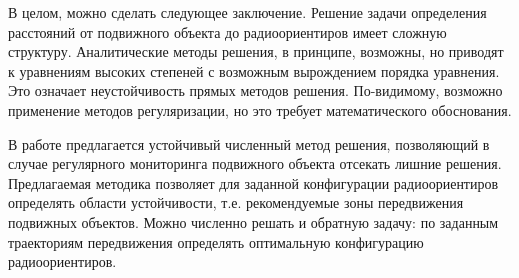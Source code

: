 \documentclass[../main.tex]{subfiles}
\begin{document}
В целом, можно сделать следующее заключение. Решение задачи определения расстояний от подвижного объекта до радиоориентиров имеет сложную структуру. Аналитические методы решения, в принципе, возможны, но приводят к уравнениям высоких степеней с возможным вырождением порядка уравнения. Это означает неустойчивость прямых методов решения. По-видимому, возможно применение методов регуляризации, но это требует математического обоснования. 

В работе предлагается устойчивый численный метод решения, позволяющий в случае регулярного мониторинга подвижного объекта отсекать лишние решения. Предлагаемая методика позволяет для заданной конфигурации радиоориентиров определять области устойчивости, т.е. рекомендуемые зоны передвижения подвижных объектов. Можно численно решать и обратную задачу: по заданным траекториям передвижения определять оптимальную конфигурацию радиоориентиров.
\end{document}
